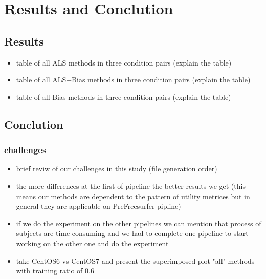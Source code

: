 \chapter{Results and Conclution}
\section{Results}
\begin{tcolorbox}
	\begin{itemize}
		\item table of all ALS methods in three condition pairs (explain the table)
		\item table of all ALS+Bias methods in three condition pairs (explain the table)
		\item table of all Bias methods in three condition pairs (explain the table)
\end{itemize}
\end{tcolorbox}

\section{Conclution}
\subsection{challenges}
\begin{tcolorbox}
	\begin{itemize}
		\item brief reviw of our challenges in this study (file generation order)	
		\item the more differences at the first of pipeline the better results we get 
		(this means our methods are dependent to the pattern of utility metrices but in general they are applicable on PreFreesurfer pipline)
		\item if we do the experiment on the other pipelines we can mention that process 
		of subjects are time consuming and we had to complete one pipeline to start working on the other one and do the experiment
		\item take CentOS6 vs CentOS7 and present the superimposed-plot "all" methods with training ratio of 0.6
\end{itemize}
\end{tcolorbox}
